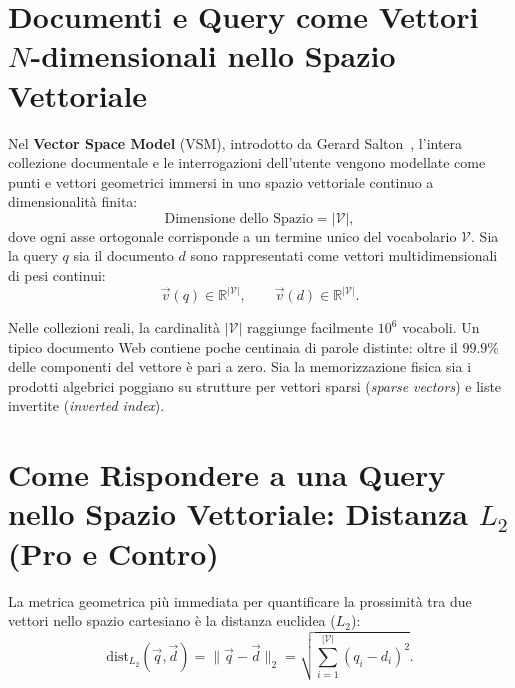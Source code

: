 \FloatBarrier
\section[Documenti e Query come Vettori N-dimensionali]{Documenti e Query come Vettori\\$N$-dimensionali nello Spazio Vettoriale}
\label{sec:vsm-fondamenti}

Nel \textbf{Vector Space Model} (VSM), introdotto da Gerard Salton~\cite{manning2008}, l'intera collezione documentale e le interrogazioni dell'utente vengono modellate come punti e vettori geometrici immersi in uno spazio vettoriale continuo a dimensionalit\`a finita:
\begin{equation}
\text{Dimensione dello Spazio} = |\mathcal{V}|,
\end{equation}
dove ogni asse ortogonale corrisponde a un termine unico del vocabolario $\mathcal{V}$.  
Sia la query $q$ sia il documento $d$ sono rappresentati come vettori multidimensionali di pesi continui:
\begin{equation}
\vec{v}(q) \in \mathbb{R}^{|\mathcal{V}|}, \qquad \vec{v}(d) \in \mathbb{R}^{|\mathcal{V}|}.
\end{equation}

\begin{property}
Nelle collezioni reali, la cardinalit\`a $|\mathcal{V}|$ raggiunge facilmente $10^6$ vocaboli. Un tipico documento Web contiene poche centinaia di parole distinte: oltre il $\mathbf{99.9\%}$ delle componenti del vettore \`e pari a zero. Sia la memorizzazione fisica sia i prodotti algebrici poggiano su strutture per vettori sparsi (\textit{sparse vectors}) e liste invertite (\textit{inverted index}).
\end{property}

\FloatBarrier
\section{Come Rispondere a una Query nello Spazio Vettoriale: Distanza $L_2$ (Pro e Contro)}
\label{sec:fallimento-distanza-euclidea}

La metrica geometrica pi\`u immediata per quantificare la prossimit\`a tra due vettori nello spazio cartesiano \`e la distanza euclidea ($L_2$):
\begin{equation}
\text{dist}_{L_2}(\vec{q}, \vec{d}) = \|\vec{q} - \vec{d}\|_2 = \sqrt{\sum_{i=1}^{|\mathcal{V}|} (q_i - d_i)^2}.
\end{equation}


